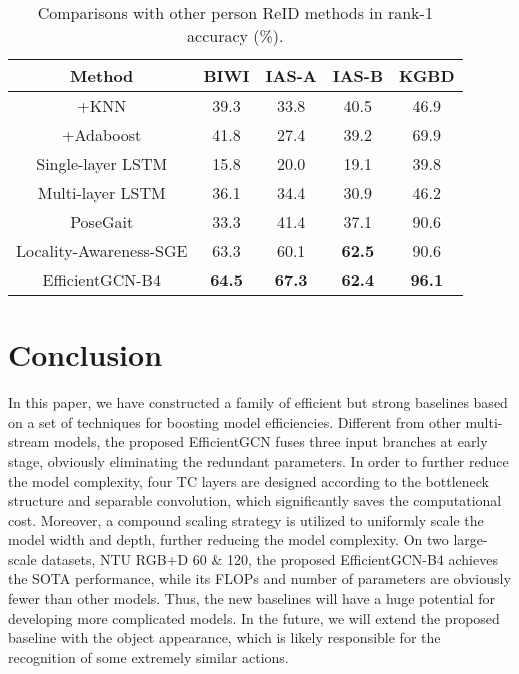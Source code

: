 \documentclass[10pt,journal,compsoc]{IEEEtran}
\begin{document}
\begin{table}[t]
  \caption{Comparisons with other person ReID methods in rank-1 accuracy (\%).}
  \label{tab:generalization}
  \centering
  \setlength{\tabcolsep}{4pt}
  \renewcommand{\arraystretch}{1.2}
  \vspace{-0.2cm}
  \begin{tabular}{c|cccc}
  \toprule
  Method & BIWI & IAS-A & IAS-B & KGBD \\
  \midrule
  +KNN \cite{munaro2014one} & 39.3 & 33.8 & 40.5 & 46.9 \\
  +Adaboost \cite{pala2019enhanced} & 41.8 & 27.4 & 39.2 & 69.9 \\
  Single-layer LSTM \cite{haque2016recurrent} & 15.8 & 20.0 & 19.1 & 39.8 \\
  Multi-layer LSTM \cite{zheng2019relational} & 36.1 & 34.4 & 30.9 & 46.2 \\
  PoseGait \cite{liao2020model} & 33.3 & 41.4 & 37.1 & 90.6 \\
  Locality-Awareness-SGE \cite{rao2021self} & 63.3 & 60.1 & {\bf 62.5} & 90.6 \\
  \midrule
  EfficientGCN-B4 & {\bf 64.5} & {\bf 67.3} & {\bf 62.4} & {\bf 96.1} \\
  \bottomrule
  \end{tabular}
\end{table}

\section{Conclusion}
\label{sec:conclusion}

In this paper, we have constructed a family of efficient but strong baselines based on a set of techniques for boosting model efficiencies. Different from other multi-stream models, the proposed EfficientGCN fuses three input branches at early stage, obviously eliminating the redundant parameters. In order to further reduce the model complexity, four TC layers are designed according to the bottleneck structure and separable convolution, which significantly saves the computational cost. Moreover, a compound scaling strategy is utilized to uniformly scale the model width and depth, further reducing the model complexity. On two large-scale datasets, NTU RGB+D 60 \& 120, the proposed EfficientGCN-B4 achieves the SOTA performance, while its FLOPs and number of parameters are obviously fewer than other models. Thus, the new baselines will have a huge potential for developing more complicated models. In the future, we will extend the proposed baseline with the object appearance, which is likely responsible for the recognition of some extremely similar actions.
\end{document}
